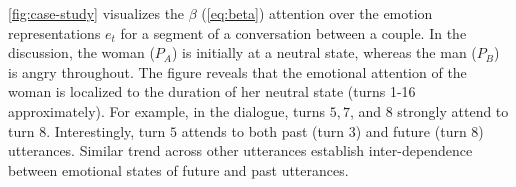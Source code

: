 \documentclass[letterpaper]{article} %
\begin{document}
\cref{fig:case-study} visualizes the $\beta$ (\cref{eq:beta}) attention over the emotion
representations $e_t$ for a segment of a conversation between a couple.
In the discussion, the woman ($P_A$) is initially at a neutral state, whereas the man ($P_B$) is angry throughout.
The figure reveals that the emotional attention of the woman is localized to the duration of her neutral state
(turns 1-16 approximately). For example, in the dialogue, turns $5, 7$, and $8$ strongly attend to turn $8$. Interestingly, turn $5$ attends to both past (turn $3$)
and future (turn $8$) utterances. Similar trend across other utterances establish inter-dependence between emotional states of future and past utterances. %
\end{document}
